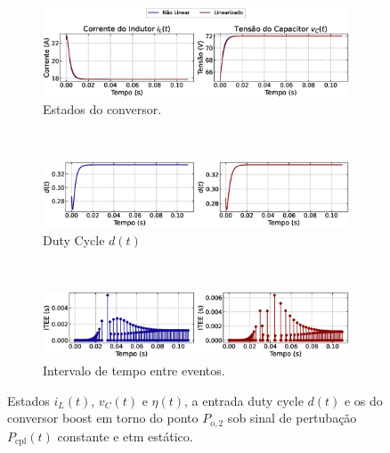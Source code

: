 \begin{figure}[H]
  \centering
  \captionsetup{justification=centering}
  \begin{subfigure}{1.\textwidth}
    \centering
    \includegraphics[width=1.\textwidth]{figuras/dynamic-etm/boost/sim1/op2/result.eps}
    \caption{Estados do conversor.}
    \label{fig:boost_converter_constant_pcpl_dynamic_etm_op2_a}
  \end{subfigure}
  \\[6pt]
  \begin{subfigure}{1.\textwidth}
    \centering
    \includegraphics[width=1.\textwidth]{figuras/dynamic-etm/boost/sim1/op2/duty-cycle.eps}
    \caption{Duty Cycle $d(t)$}
    \label{fig:boost_converter_constant_pcpl_dynamic_etm_op2_b}
  \end{subfigure}
  \\[6pt]
  \begin{subfigure}{1.\textwidth}
    \centering
    \includegraphics[width=1.\textwidth]{figuras/dynamic-etm/boost/sim1/op2/inter-event-times.eps}
    \caption{Intervalo de tempo entre eventos.}
    \label{fig:boost_converter_constant_pcpl_dynamic_etm_op2_c}
  \end{subfigure}
  \caption{Estados $i_L(t)$, $v_C(t)$ e $\eta(t)$, a entrada duty cycle $d(t)$ e os  do conversor boost em torno do ponto $P_{\mathrm{o}, 2}$ sob sinal de pertubação $P_{\mathrm{cpl}}(t)$ constante e \acrshort{etm} estático.}
  \label{fig:boost_converter_constant_pcpl_dynamic_etm_op2}
\end{figure}

